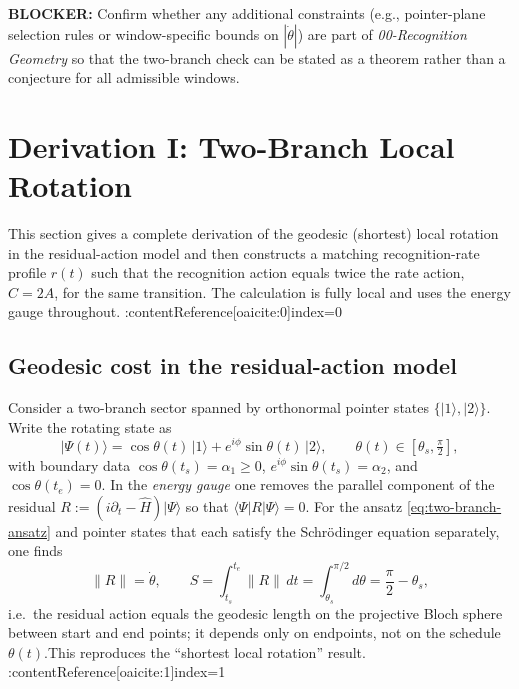 \documentclass[11pt,letterpaper]{article}
\begin{document}
\noindent\textbf{BLOCKER:} Confirm whether any additional constraints (e.g., pointer-plane selection rules or window-specific bounds on \(|\dot\theta|\)) are part of \emph{00-Recognition Geometry} so that the two-branch check can be stated as a theorem rather than a conjecture for all admissible windows.

\section{Derivation I: Two-Branch Local Rotation}

This section gives a complete derivation of the geodesic (shortest) local rotation in the residual-action model and then constructs a matching recognition-rate profile \(r(t)\) such that the recognition action equals twice the rate action, \(C=2A\), for the same transition. The calculation is fully local and uses the energy gauge throughout. :contentReference[oaicite:0]{index=0}

\subsection{Geodesic cost in the residual-action model}

Consider a two-branch sector spanned by orthonormal pointer states \(\{|1\rangle,|2\rangle\}\). Write the rotating state as
\begin{equation}
\label{eq:two-branch-ansatz}
|\Psi(t)\rangle=\cos\theta(t)\,|1\rangle+e^{i\phi}\sin\theta(t)\,|2\rangle,
\qquad \theta(t)\in[\theta_s,\tfrac{\pi}{2}],
\end{equation}
with boundary data \(\cos\theta(t_s)=\alpha_1\ge 0\), \(e^{i\phi}\sin\theta(t_s)=\alpha_2\), and \(\cos\theta(t_e)=0\). In the \emph{energy gauge} one removes the parallel component of the residual \(R:=(i\partial_t-\hat H)|\Psi\rangle\) so that \(\langle\Psi|R|\Psi\rangle=0\). For the ansatz \eqref{eq:two-branch-ansatz} and pointer states that each satisfy the Schr\"odinger equation separately, one finds
\begin{equation}
\|R\|=\dot\theta,
\qquad
S=\int_{t_s}^{t_e}\!\|R\|\,dt=\int_{\theta_s}^{\pi/2} d\theta=\frac{\pi}{2}-\theta_s,
\label{eq:S-geodesic}
\end{equation}
i.e.\ the residual action equals the geodesic length on the projective Bloch sphere between start and end points; it depends only on endpoints, not on the schedule \(\theta(t)\).\;This reproduces the ``shortest local rotation'' result. :contentReference[oaicite:1]{index=1}
\end{document}
